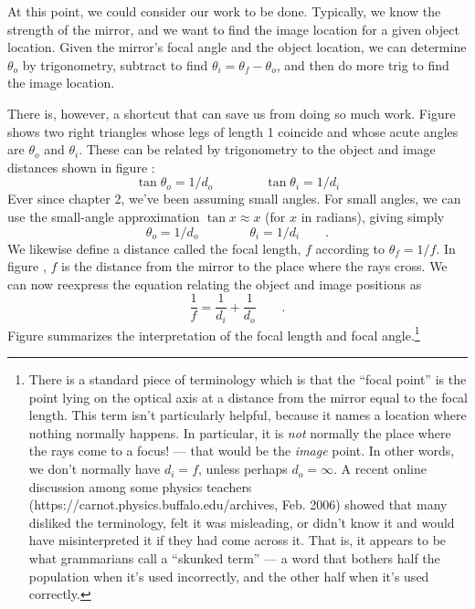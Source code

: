At this point, we could consider our work to be done.
Typically, we know the strength of the mirror, and we want
to find the image location for a given object location.
Given the mirror's focal angle and the object location, we
can determine $\theta_o$ by trigonometry, subtract to find
$\theta_i=\theta_f-\theta_o$, and then do more trig to
find the image location.

There is, however, a shortcut that can save us from doing so
much work. Figure  shows two right triangles whose legs
of length 1 coincide and whose acute angles are $\theta_o$
and $\theta_i$. These can be related by trigonometry to the
object and image distances shown in figure :
\begin{equation*}
                \tan  \theta_o = 1/d_o \qquad \qquad        \tan  \theta_i  =  1/d_i
\end{equation*}
Ever since chapter 2, we've been assuming small angles. For
small angles, we can use the small-angle approximation 
$\tan x\approx x$ (for $x$ in radians), giving simply
\begin{equation*}
                \theta_o = 1/d_o \qquad\qquad \theta_i  =  1/d_i   \qquad   .
\end{equation*}
We likewise define a distance called the focal length, $f$ according to $\theta_f=1/f$. In figure , $f$
is the distance from the mirror to the place where the rays cross. We can
now reexpress the equation relating the object and image positions as
\begin{equation*}
        \frac{1}{f} = \frac{1}{d_i}+\frac{1}{d_o}  \qquad   .
\end{equation*}
Figure  summarizes the interpretation of the focal
length and focal angle.\footnote{There is a standard piece of terminology
which is that the ``focal point'' is the point lying on the optical
axis at a distance from the mirror equal to the focal length.
This term isn't particularly helpful, because it names a location where nothing
normally happens. In particular, it is \emph{not} normally the place where
the rays come to a focus! --- that would be the \emph{image} point.
In other words, we don't normally have $d_i=f$, unless perhaps
$d_o=\infty$. A recent online discussion among some physics teachers 
(https://carnot.physics.buffalo.edu/archives, Feb. 2006) showed that
many disliked the terminology, felt it was misleading, or didn't know it and would have
misinterpreted it if they had come across it. That is, it appears to be what grammarians
call a ``skunked term'' --- a word that bothers half the population when it's used
incorrectly, and the other half when it's used correctly.}

